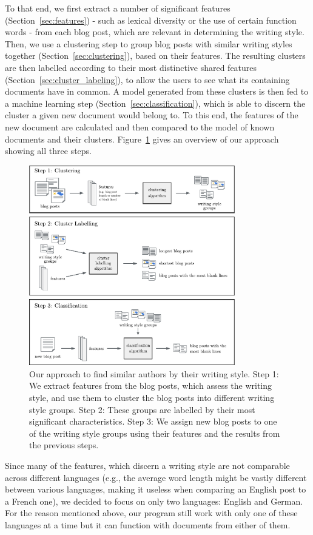 To that end, we first extract a number of significant features (Section~\ref{sec:features}) - such as lexical diversity or the use of certain function words - from each blog post, which are relevant in determining the writing style.
Then, we use a clustering step to group blog posts with similar writing styles together (Section~\ref{sec:clustering}), based on their features.
The resulting clusters are then labelled according to their most distinctive shared features (Section~\ref{sec:cluster_labeling}), to allow the users to see what its containing documents have in common.
A model generated from these clusters is then fed to a machine learning step (Section~\ref{sec:classification}), which is able to discern the cluster a given new document would belong to.
To this end, the features of the new document are calculated and then compared to the model of known documents and their clusters.
Figure~\ref{fig:figure_1} gives an overview of our approach showing all three steps.

\begin{figure}[ht!]
    \centering
    \includegraphics[width=0.8\textwidth]{images/Figure_1.pdf}
    \caption{Our approach to find similar authors by their writing style. Step 1: We extract features from the blog posts, which assess the writing style, and use them to cluster the blog posts into different writing style groups. Step 2: These groups are labelled by their most significant characteristics. Step 3: We assign new blog posts to one of the writing style groups using their features and the results from the previous steps.}
    \label{fig:figure_1}
\end{figure}

Since many of the features, which discern a writing style are not comparable across different languages (e.g., the average word length might be vastly different between various languages, making it useless when comparing an English post to a French one), we decided to focus on only two languages: English and German.
For the reason mentioned above, our program still work with only one of these languages at a time but it can function with documents from either of them.

